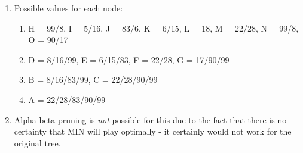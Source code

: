 \documentclass[11pt]{article}
\begin{document}
\begin{enumerate}
\begin{enumerate}
\begin{enumerate}
\item Possible values for each node:
\begin{enumerate}
\item H = 99/8, I = 5/16, J = 83/6, K = 6/15, L = 18, M = 22/28, N = 99/8, O = 90/17
\item D = 8/16/99, E = 6/15/83, F = 22/28, G = 17/90/99
\item B = 8/16/83/99, C = 22/28/90/99
\item A = 22/28/83/90/99
\end{enumerate}
\item Alpha-beta pruning is \textit{not} possible for this due to the fact that there is no certainty that MIN will play optimally - it certainly would not work for the original tree.
\end{enumerate}
\end{enumerate}


\end{enumerate}
\end{document}
